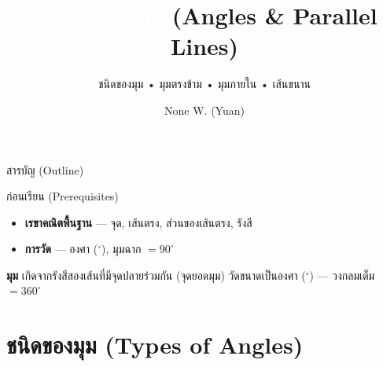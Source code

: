 \documentclass[11pt, aspectratio=169]{beamer}
\title[มุม]{\textcolor{white}{มุมและเส้นขนาน} \textcolor{boxBlue!60}{(Angles \& Parallel Lines)}}
\subtitle{ชนิดของมุม • มุมตรงข้าม • มุมภายใน • เส้นขนาน }
\author[None W. (Yuan)]{None W. (Yuan)}
\date{}
\begin{document}
\begin{frame}[plain]\titlepage\end{frame}
\begin{frame}{สารบัญ (Outline)}\tableofcontents\end{frame}

\begin{frame}{ก่อนเรียน (Prerequisites)}
  \begin{explanation}
    \begin{itemize}
      \item \textbf{เรขาคณิตพื้นฐาน} — จุด, เส้นตรง, ส่วนของเส้นตรง, รังสี
      \item \textbf{การวัด} — องศา ($^\circ$), มุมฉาก $= 90^\circ$
    \end{itemize}
  \end{explanation}

  \begin{intuition}[มุมคืออะไร?]
    \textbf{มุม} เกิดจากรังสีสองเส้นที่มีจุดปลายร่วมกัน (จุดยอดมุม)
    วัดขนาดเป็นองศา ($^\circ$) — วงกลมเต็ม $= 360^\circ$
  \end{intuition}
\end{frame}

\section{ชนิดของมุม (Types of Angles)}
\end{document}

